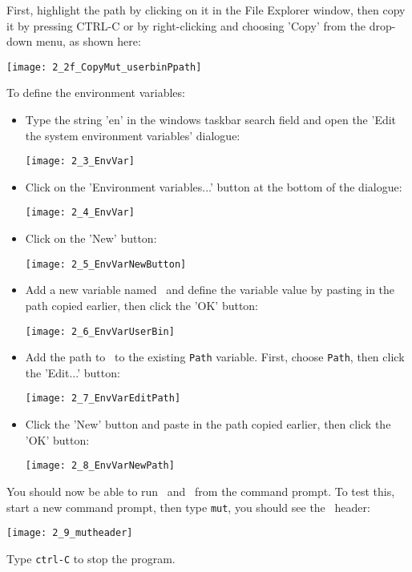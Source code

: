 First,  highlight the path by clicking on it in the File Explorer window, then copy it by pressing CTRL-C or by right-clicking and choosing 'Copy' from the drop-down menu, as shown here:

        \texttt{[image: 2\_2f\_CopyMut\_userbinPpath]}


To define the environment variables:
\begin{itemize}
     \item Type the string 'en' in the windows taskbar search field and open the 'Edit the system environment variables' dialogue:

        \texttt{[image: 2\_3\_EnvVar]}

     \item Click on the 'Environment variables...' button at the bottom of the dialogue:

        \texttt{[image: 2\_4\_EnvVar]}


     \item Click on the 'New' button:

        \texttt{[image: 2\_5\_EnvVarNewButton]}

     \item Add a new variable named \bin\ and define the variable value by pasting in the path copied earlier, then click the 'OK' button:

        \texttt{[image: 2\_6\_EnvVarUserBin]}

     \item Add the path to \bin\ to the existing \texttt{Path} variable.  First, choose \texttt{Path}, then click the 'Edit...' button:

        \texttt{[image: 2\_7\_EnvVarEditPath]}

     \item Click the 'New' button and paste in the path copied earlier, then click the 'OK' button:

        \texttt{[image: 2\_8\_EnvVarNewPath]}

\end{itemize}

You should now be able to run \mut\ and \mfus\ from the command prompt.  To test this, start a new command prompt, then type \texttt{mut}, you should see the \mut\ header:

    \texttt{[image: 2\_9\_mutheader]}

Type \texttt{ctrl-C} to stop the program.

